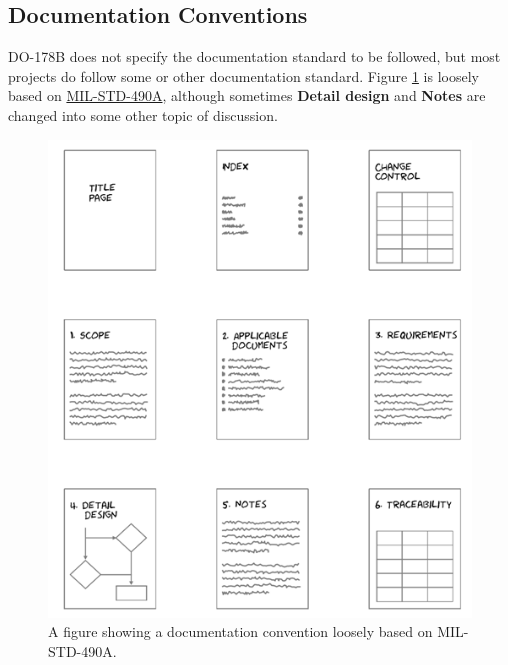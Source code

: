 \documentclass[11pt]{article}
\begin{document}
\subsection{Documentation Conventions}
DO-178B does not specify the documentation standard to be followed, but most projects do follow some or other documentation standard. Figure \ref{figure-doc-con} is loosely based on \href{https://en.wikipedia.org/wiki/MIL-STD-498}{MIL-STD-490A}, although sometimes \textbf{Detail design} and \textbf{Notes} are changed into some other topic of discussion.
\begin{figure}[H]
\centering
\includegraphics[scale=0.8]{./images/doc_convention.png}
\caption[Documentation Convention MIL-STD-490A]{A figure showing a documentation convention loosely based on MIL-STD-490A.}
\label{figure-doc-con}
\end{figure}
\end{document}
